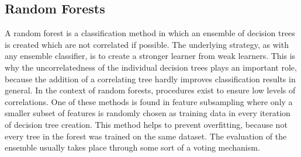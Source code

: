 \subsection{Random Forests}\label{subsec:random_forests}

A random forest is a classification method in which an ensemble of decision trees is created which are not correlated if possible. The underlying strategy, as with any ensemble classifier, is to create a stronger learner from weak learners. This is why the uncorrelatedness of the individual decision trees plays an important role, because the addition of a correlating tree hardly improves classification results in general. In the context of random forests, procedures exist to ensure low levels of correlations. One of these methods is found in feature subsampling where only a smaller subset of features is randomly chosen as training data in every iteration of decision tree creation. This method helps to prevent overfitting, because not every tree in the forest was trained on the same dataset. The evaluation of the ensemble usually takes place through some sort of a voting mechanism. \cite{Jiang}

